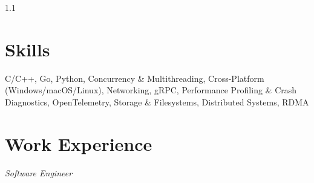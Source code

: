 \documentclass{yijiem}
\begin{document}
\begin{spacing}{1.1}
\end{spacing}

\section{Skills}
    C/C++, Go, Python, Concurrency \& Multithreading, Cross-Platform (Windows/macOS/Linux), Networking, gRPC, \mbox{Performance} Profiling \& Crash Diagnostics, OpenTelemetry, Storage \& Filesystems, Distributed Systems, RDMA

\section{Work Experience}
    \textit{\small Software Engineer}
\end{document}
